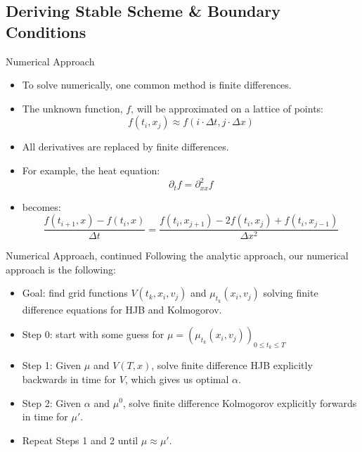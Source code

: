\documentclass{beamer}
\begin{document}
\subsection{Deriving Stable Scheme \& Boundary Conditions}

\begin{frame}{Numerical Approach}
		\begin{itemize}
			\item {
				To solve numerically, one common method is finite differences.
			}
			\item {
				The unknown function, $f$, will be approximated on a lattice of points:
				\begin{equation}
				f(t_i,x_j) \approx f(i \cdot \Delta t,j \cdot \Delta x)
				\end{equation}
			}
			\item {
				All derivatives are replaced by finite differences.
			}
			\item {
				For example, the heat equation:
				\begin{equation}
				\partial_t f= \partial_{xx}^2 f
				\end{equation}
			}
			\item {
				becomes:
				\begin{equation}
				\frac{f(t_{i+1},x)-f(t_i,x)}{\Delta t}=\frac{f(t_i,x_{j+1})-2f(t_i,x_j)+f(t_i,x_{j-1})}{\Delta x^2}
				\end{equation}
			}
		\end{itemize}
\end{frame}

\begin{frame}{Numerical Approach, continued}
	Following the analytic approach, our numerical approach is the following:
	\begin{itemize}
			\item {
				Goal: find grid functions $V(t_k,x_i,v_j)$ and $\mu_{t_k}(x_i,v_j)$ solving finite difference equations for HJB and Kolmogorov.
			}
			\item {
				Step 0: start with some guess for $\mu=(\mu_{t_k}(x_i,v_j))_{0 \leq t_k \leq T}$
			}
			\item {
				Step 1: Given $\mu$ and $V(T,x)$, solve finite difference HJB explicitly backwards in time for $V$, which gives us optimal $\alpha$.
			}
			\item {
				Step 2: Given $\alpha$ and $\mu^0$, solve finite difference Kolmogorov explicitly forwards in time for $\mu '$.
			}
			\item {
				Repeat Steps 1 and 2 until $\mu \approx \mu '$.
			}
	\end{itemize}
\end{frame}
\end{document}
